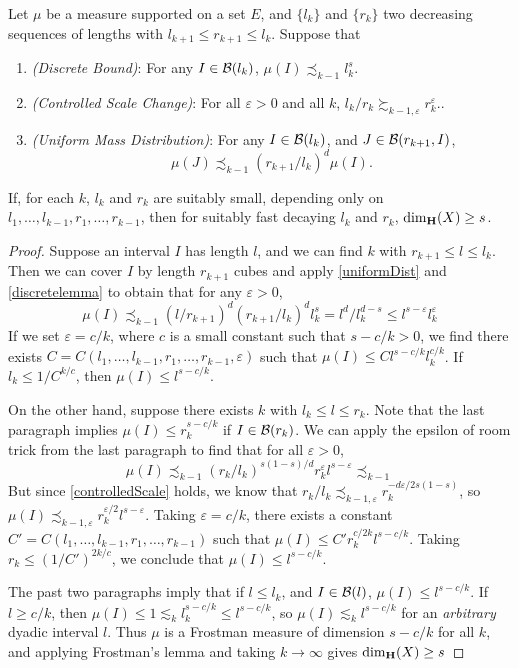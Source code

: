 \begin{theorem} \label{uniformHausdorffResult}
    Let $\mu$ be a measure supported on a set $E$, and $\{ l_k \}$ and $\{ r_k \}$ two decreasing sequences of lengths with $l_{k+1} \leq r_{k+1} \leq l_k$. Suppose that
    \begin{enumerate}
    	\item \label{discreteBound} \emph{(Discrete Bound)}: For any $I \in \operatorname{\mathcal{B}}(l_k)$, $\mu(I) \precsim_{k-1} l_k^s$.
    	\item \label{controlledScale} \emph{(Controlled Scale Change)}: For all $\varepsilon > 0$ and all $k$, $l_k/r_k \succsim_{k-1,\varepsilon} r_k^\varepsilon$..
    	\item \label{uniformDist} \emph{(Uniform Mass Distribution)}: For any $I \in \operatorname{\mathcal{B}}(l_k)$, and $J \in \operatorname{\mathcal{B}}(r_{k+1},I)$,
    	\[ \mu(J) \precsim_{k-1} (r_{k+1}/l_k)^d \mu(I). \]
    \end{enumerate}
	If, for each $k$, $l_k$ and $r_k$ are suitably small, depending only on $l_1, \dots, l_{k-1}, r_1, \dots, r_{k-1}$, then for suitably fast decaying $l_k$ and $r_k$, $\operatorname{\dim_{\mathbf{H}}}(X) \geq s$.
\end{theorem}
\begin{proof}
	Suppose an interval $I$ has length $l$, and we can find $k$ with $r_{k+1} \leq l \leq l_k$. Then we can cover $I$ by length $r_{k+1}$ cubes and apply \ref{uniformDist} and \ref{discretelemma} to obtain that for any $\varepsilon > 0$,
    \[ \mu(I) \precsim_{k-1} (l/r_{k+1})^d (r_{k+1}/l_k)^d l_k^s = l^d / l_k^{d-s} \leq l^{s-\varepsilon} l_k^\varepsilon \]
    If we set $\varepsilon = c/k$, where $c$ is a small constant such that $s - c/k > 0$, we find there exists $C = C(l_1,\dots,l_{k-1},r_1,\dots,r_{k-1},\varepsilon)$ such that $\mu(I) \leq C l^{s - c/k} l_k^{c/k}$. If $l_k \leq 1/C^{k/c}$, then $\mu(I) \leq l^{s - c/k}$.

    On the other hand, suppose there exists $k$ with $l_k \leq l \leq r_k$. Note that the last paragraph implies $\mu(I) \leq r_k^{s - c/k}$ if $I \in \operatorname{\mathcal{B}}(r_k)$. We can apply the epsilon of room trick from the last paragraph to find that for all $\varepsilon > 0$,
%
	\[ \mu(I) \precsim_{k-1} \left( r_k/l_k \right)^{s(1 - s)/d} r_k^\varepsilon l^{s - \varepsilon} \precsim_{k-1} \]
	But since \ref{controlledScale} holds, we know that $r_k/l_k \precsim_{k-1,\varepsilon} r_k^{- d\varepsilon/2s(1-s)}$, so $\mu(I) \precsim_{k-1,\varepsilon} r_k^{\varepsilon/2} l^{s-\varepsilon}$. Taking $\varepsilon = c/k$, there exists a constant $C' = C(l_1, \dots, l_{k-1}, r_1, \dots, r_{k-1})$ such that $\mu(I) \leq C' r_k^{c/2k} l^{s-c/k}$. Taking $r_k \leq (1/C')^{2k/c}$, we conclude that $\mu(I) \leq l^{s-c/k}$.

	The past two paragraphs imply that if $l \leq l_k$, and $I \in \operatorname{\mathcal{B}}(l)$, $\mu(I) \leq l^{s-c/k}$. If $l \geq c/k$, then $\mu(I) \leq 1 \lesssim_k l_k^{s - c/k} \leq l^{s - c/k}$, so $\mu(I) \lesssim_k l^{s - c/k}$ for an {\it arbitrary} dyadic interval $l$. Thus $\mu$ is a Frostman measure of dimension $s - c/k$ for all $k$, and applying Frostman's lemma and taking $k \to \infty$ gives $\operatorname{\dim_{\mathbf{H}}}(X) \geq s$
\end{proof}

